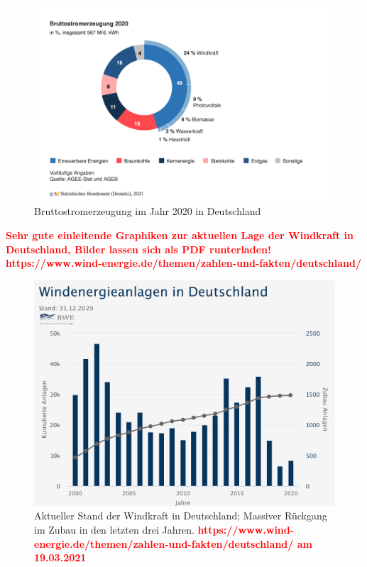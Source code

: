 \documentclass[
12pt, %
toc=listofnumbered, %
toc=chapterentrydotfill, %
numbers=noenddot, %
captions=tableheading, %
]{scrreprt}
\newcommand{\highlight}[1]{\textbf{\textcolor{red}{#1}}}
\begin{document}
\begin{figure}[tph]
	\begin{center}
		\includegraphics[width=.8\textwidth]{./images/bruttostromerzeugung-erneuerbare-energien.png}
		\caption{Bruttostromerzeugung im Jahr 2020 in Deutschland}
		\label{fig:strommix_deutschland}
	\end{center}
\end{figure}

\highlight{Sehr gute einleitende Graphiken zur aktuellen Lage der Windkraft in Deutschland, Bilder lassen sich als PDF runterladen!\\
https://www.wind-energie.de/themen/zahlen-und-fakten/deutschland/}

\begin{figure}[tph]
	\begin{center}
		\includegraphics[width=.8\textwidth]{./images/windanlagen_deutschland.pdf}
		\caption{Aktueller Stand der Windkraft in Deutschland; Massiver Rückgang im Zubau in den letzten drei Jahren. \highlight{https://www.wind-energie.de/themen/zahlen-und-fakten/deutschland/ am 19.03.2021}}
		\label{fig:windkraft_deutschland}
	\end{center}
\end{figure}
\end{document}
